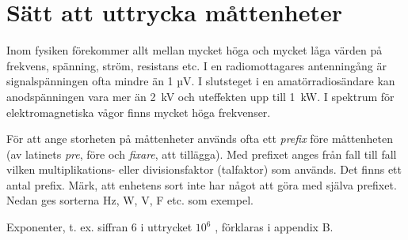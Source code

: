 \chapter{Sätt att uttrycka måttenheter}

  Inom fysiken förekommer allt mellan mycket höga och mycket låga
  värden på frekvens, spänning, ström, resistans etc.  I en
  radiomottagares antenningång är signalspänningen ofta mindre än
  1 µV.  I slutsteget i en amatörradiosändare kan anodspänningen vara
  mer än 2~kV och uteffekten upp till 1~kW.  I spektrum för
  elektromagnetiska vågor finns mycket höga frekvenser.

  För att ange storheten på måttenheter används ofta ett \emph{prefix}
  före måttenheten (av latinets \emph{pre}, före och \emph{fixare},
  att tillägga). Med prefixet anges från fall till fall vilken
  multiplikations- eller divisionsfaktor (talfaktor) som används. Det
  finns ett antal prefix.  Märk, att enhetens sort inte har något att
  göra med själva prefixet. Nedan ges sorterna Hz, W, V, F etc. som
  exempel.

  Exponenter, t. ex. siffran 6 i uttrycket \(10^6\) , förklaras i appendix B.

